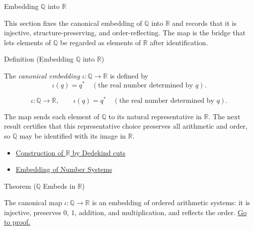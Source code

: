\label{sec:embedding-q-into-r}

\begin{topicbox}{Embedding $\mathbb{Q}$ into $\mathbb{R}$}
\begin{exposition}
This section fixes the canonical embedding of $\mathbb{Q}$ into $\mathbb{R}$ and records that it is injective, structure-preserving, and order-reflecting. The map is the bridge that lets elements of $\mathbb{Q}$ be regarded as elements of $\mathbb{R}$ after identification.
\end{exposition}
\end{topicbox}
\begin{definitionbox}{Definition (Embedding $\mathbb{Q}$ into $\mathbb{R}$)}
\begin{definition}
\label{def:embedding-q-into-r}
The \emph{canonical embedding} $\iota:\mathbb{Q}\to \mathbb{R}$ is defined by
\[
\iota(q)=q^{*} \quad(\text{the real number determined by } q).
\]
\end{definition}
\end{definitionbox}
\begin{remark*}
\[
\iota:\mathbb{Q}\to \mathbb{R},\qquad \iota(q)=q^{*} \quad(\text{the real number determined by } q).
\]
\end{remark*}
\begin{remark*}[Interpretation]
The map sends each element of $\mathbb{Q}$ to its natural representative in $\mathbb{R}$. The next result certifies that this representative choice preserves all arithmetic and order, so $\mathbb{Q}$ may be identified with its image in $\mathbb{R}$.
\end{remark*}
\begin{dependencies}
\begin{itemize}
  \item \hyperref[def:reals]{Construction of $\mathbb{R}$ by Dedekind cuts}
  \item \hyperref[def:number-system-embedding]{Embedding of Number Systems}
\end{itemize}
\end{dependencies}
\begin{theorembox}{Theorem ($\mathbb{Q}$ Embeds in $\mathbb{R}$)}
\begin{theorem}
\label{thm:q-embeds-in-r}
The canonical map $\iota:\mathbb{Q}\to \mathbb{R}$ is an embedding of ordered arithmetic systems: it is injective, preserves $0$, $1$, addition, and multiplication, and reflects the order.
\hyperref[prf:q-embeds-in-r]{Go to proof.}
\end{theorem}
\end{theorembox}
